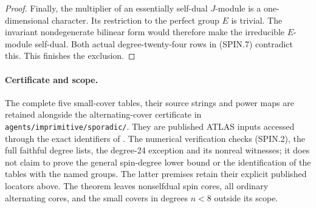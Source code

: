 \begin{proof}
Finally, the multiplier of an essentially self-dual $J$-module
is a one-dimensional character.  Its restriction to the perfect
group $E$ is trivial.  The invariant nondegenerate bilinear form
would therefore make the irreducible $E$-module self-dual.
Both actual degree-twenty-four rows in (SPIN.7) contradict this.
This finishes the exclusion.
\end{proof}

\paragraph{Certificate and scope.}
The complete five small-cover tables, their source strings and
power maps are retained alongside the alternating-cover
certificate in \texttt{agents/imprimitive/sporadic/}.
They are published ATLAS inputs accessed through the exact
identifiers of \cite{SPOR:CTblLib}.  The numerical verification
checks (SPIN.2), the full faithful degree lists, the degree-24
exception and its nonreal witnesses; it does not claim to prove
the general spin-degree lower bound or the identification of
the tables with the named groups.  The latter premises retain
their explicit published locators above.
The theorem leaves nonselfdual spin cores, all ordinary
alternating cores, and the small covers in degrees $n<8$
outside its scope.
